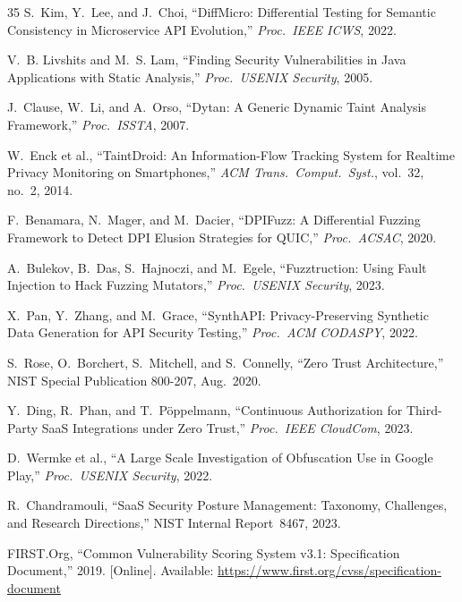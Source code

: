 \documentclass[conference]{IEEEtran}
\begin{document}
\begin{thebibliography}{35}
S.~Kim, Y.~Lee, and J.~Choi, ``DiffMicro: Differential Testing for
Semantic Consistency in Microservice API Evolution,''
\textit{Proc.\ IEEE ICWS}, 2022.

V.~B. Livshits and M.~S. Lam, ``Finding Security Vulnerabilities in
Java Applications with Static Analysis,'' \textit{Proc.\ USENIX
Security}, 2005.

J.~Clause, W.~Li, and A.~Orso, ``Dytan: A Generic Dynamic Taint
Analysis Framework,'' \textit{Proc.\ ISSTA}, 2007.

W.~Enck et al., ``TaintDroid: An Information-Flow Tracking System
for Realtime Privacy Monitoring on Smartphones,'' \textit{ACM Trans.\
Comput.\ Syst.}, vol.~32, no.~2, 2014.

F.~Benamara, N.~Mager, and M.~Dacier, ``DPIFuzz: A Differential
Fuzzing Framework to Detect DPI Elusion Strategies for QUIC,''
\textit{Proc.\ ACSAC}, 2020.

A.~Bulekov, B.~Das, S.~Hajnoczi, and M.~Egele, ``Fuzztruction:
Using Fault Injection to Hack Fuzzing Mutators,'' \textit{Proc.\
USENIX Security}, 2023.

X.~Pan, Y.~Zhang, and M.~Grace, ``SynthAPI: Privacy-Preserving
Synthetic Data Generation for API Security Testing,'' \textit{Proc.\
ACM CODASPY}, 2022.

\bibitem{nist_zt2020}
S.~Rose, O.~Borchert, S.~Mitchell, and S.~Connelly, ``Zero Trust
Architecture,'' NIST Special Publication 800-207, Aug.~2020.

\bibitem{ding2023}
Y.~Ding, R.~Phan, and T.~P\"{o}ppelmann, ``Continuous Authorization
for Third-Party SaaS Integrations under Zero Trust,'' \textit{Proc.\
IEEE CloudCom}, 2023.

\bibitem{wermke2022}
D.~Wermke et al., ``A Large Scale Investigation of Obfuscation Use
in Google Play,'' \textit{Proc.\ USENIX Security}, 2022.

R.~Chandramouli, ``SaaS Security Posture Management: Taxonomy,
Challenges, and Research Directions,'' NIST Internal Report~8467,
2023.

\bibitem{cvss31}
FIRST.Org, ``Common Vulnerability Scoring System v3.1: Specification
Document,'' 2019. [Online]. Available:
\url{https://www.first.org/cvss/specification-document}

\end{thebibliography}
\end{document}
